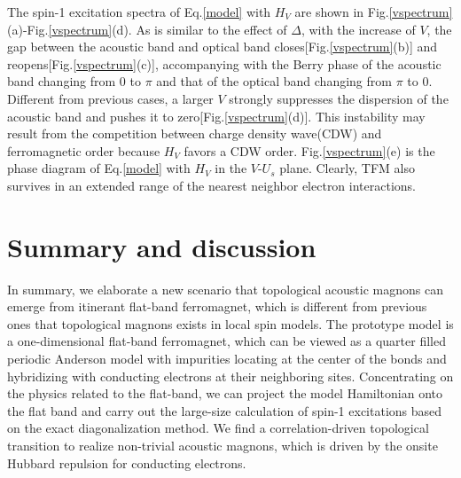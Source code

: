 \documentclass[amsmath,superscriptaddress,showpacs,aps,prb,twocolumn]{revtex4-1}
\begin{document}
\par The spin-1 excitation spectra of Eq.\ref{model} with $H_V$ are shown in Fig.\ref{vspectrum}(a)-Fig.\ref{vspectrum}(d). As is similar to the effect of $\Delta$, with the increase of $V$, the gap between the acoustic band and optical band closes[Fig.\ref{vspectrum}(b)] and reopens[Fig.\ref{vspectrum}(c)], accompanying with the Berry phase of the acoustic band changing from $0$ to $\pi$ and that of the optical band changing from $\pi$ to $0$. Different from previous cases, a larger $V$ strongly suppresses the dispersion of the acoustic band and pushes it to zero[Fig.\ref{vspectrum}(d)]. This instability may result from the competition between charge density wave(CDW) and ferromagnetic order because $H_V$ favors a CDW order. Fig.\ref{vspectrum}(e) is the phase diagram of Eq.\ref{model} with $H_V$ in the $V$-$U_s$ plane. Clearly, TFM also survives in an extended range of the nearest neighbor electron interactions.

\section{Summary and discussion}\label{sd}
\par In summary, we elaborate a new scenario that topological acoustic magnons can emerge from itinerant flat-band ferromagnet, which is different from previous ones that topological magnons exists in local spin models. The prototype model is a one-dimensional flat-band ferromagnet, which can be viewed as a quarter filled periodic Anderson model with impurities locating at the center of the bonds and hybridizing with conducting electrons at their neighboring sites. Concentrating on the physics related to the flat-band, we can project the model Hamiltonian onto the flat band and carry out the large-size calculation of spin-1 excitations based on the exact diagonalization method. We find a correlation-driven topological transition to realize non-trivial acoustic magnons, which is driven by the onsite Hubbard repulsion for conducting electrons.
\end{document}
